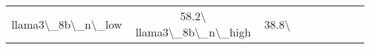 \begin{table}[htbp]
{\begin{tabular}{lcccccccc}
llama3\textbackslash{}_8b\textbackslash{}_n\textbackslash{}_low & 58.2\textbackslash{}%
llama3\textbackslash{}_8b\textbackslash{}_n\textbackslash{}_high & 38.8\textbackslash{}%
\bottomrule
\end{tabular}
}
\end{table}